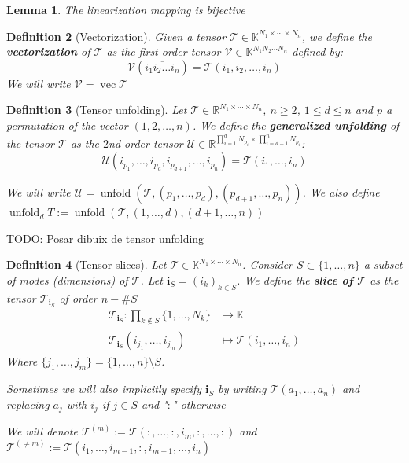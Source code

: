 \documentclass[11pt,a4paper,openright,oneside]{book}
\numberwithin{equation}{section}
\newtheorem{defn0}{Definition}[chapter]
\newtheorem{lemma0}[defn0]{Lemma}
\newenvironment{definition}{ \begin{defn0}}{\end{defn0}}
\newenvironment{lemma}{\bigskip \begin{lemma0}}{\end{lemma0}}
\DeclareMathOperator{\vectorize}{vec}
\DeclareMathOperator{\unfolding}{unfold}
\begin{document}
\begin{lemma}
    The linearization mapping is bijective
\end{lemma}

\begin{definition}[Vectorization]
    Given a tensor $\mathcal{T} \in \mathbb{K}^{N_1 \times \cdots \times N_n}$, we define the \textbf{vectorization} of $\mathcal{T}$
    as the first order tensor $\mathcal{V} \in \mathbb{K}^{N_1 N_2 \cdots N_n}$ defined by:
    $$\mathcal{V}(\overline{i_1 i_2 \dots i_n}) = \mathcal{T}(i_1, i_2, \dots, i_n)$$
    We will write $\mathcal{V} = \vectorize{\mathcal{T}}$
\end{definition}


\begin{definition}[Tensor unfolding]
Let $\mathcal{T} \in \mathbb{R}^{N_1 \times \cdots \times N_n}$, $n \geqslant 2$, $1 \leqslant d \leqslant n$ and $p$ a permutation of the vector $(1,2,\dots, n)$. We define the
\textbf{generalized unfolding} of the tensor $\mathcal{T}$ as the $2$nd-order tensor 
$\mathcal{U} \in \mathbb{R}^{\prod_{i=1}^d N_{p_i} \times \prod_{i=d+1}^n N_{p_i}}$:
$$ \mathcal{U} (\overline{i_{p_1}, \dots, i_{p_d}}, \overline{i_{p_{d+1}}, \dots, i_{p_n}}) = \mathcal{T}(i_1, \dots, i_n)$$

We will write $\mathcal{U} = \unfolding{(\mathcal{T}, (p_1, \dots, p_d), (p_{d+1}, \dots, p_n))}$. 
We also define $\unfolding_d T := \unfolding{(\mathcal{T}, (1, \dots, d), (d+1, \dots, n))}$
\end{definition}

TODO: Posar dibuix de tensor unfolding

\begin{definition}[Tensor slices]

    Let $\mathcal{T} \in \mathbb{K}^{N_1\times \cdots \times N_n}$. Consider $S \subset \{1, \dots, n\}$ a subset of modes (dimensions)
    of $\mathcal{T}$. Let $\mathbf{i}_S = (i_k)_{k \in S}$. We define the \textbf{slice of $\mathcal{T}$} as the tensor $\mathcal{T}_{\mathbf{i}_S}$
    of order $n - \#S$
    $$\begin{align}
        \mathcal{T}_{\mathbf{i}_S} : \prod_{k \not\in S} \{1, \dots, N_k\} & \longrightarrow \mathbb{K} \\
        \mathcal{T}_{\mathbf{i}_S}(i_{j_1}, \dots, i_{j_m}) & \longmapsto \mathcal{T}(i_1, \dots, i_n)
    \end{align}$$
    Where $\{j_1, \dots, j_m\} = \{1, \dots, n\} \setminus S$. 

    Sometimes we will also implicitly specify $\mathbf{i}_S$ by writing $\mathcal{T}(a_1, \dots, a_n)$ and replacing $a_j$ with $i_j$ if $j \in S$ and "$:$" otherwise

    We will denote $\mathcal{T}^{(m)} := \mathcal{T}(:, \dots, :, i_m, :, \dots, :)$ and $\mathcal{T}^{(\neq m)} := \mathcal{T}(i_1, \dots, i_{m-1}, :, i_{m+1}, \dots, i_n)$
\end{definition}
\end{document}

